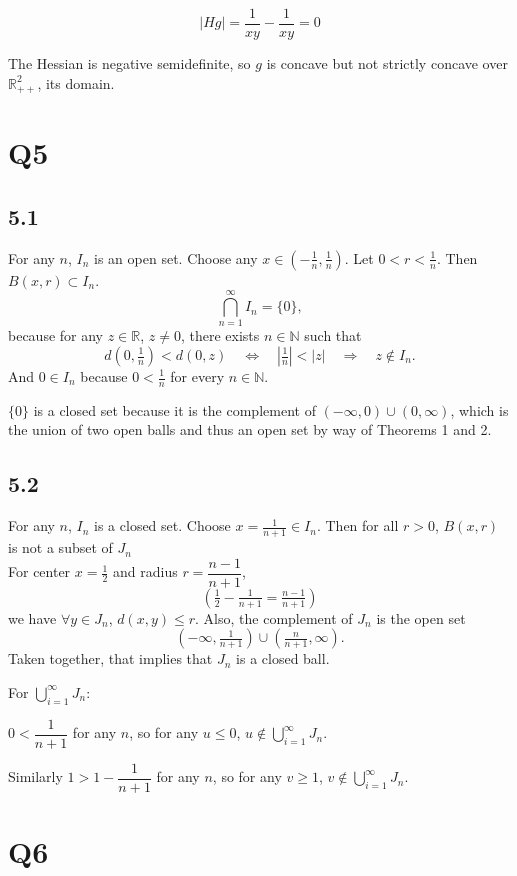 \documentclass{article}
\begin{document}
\[
|Hg|=\frac{1}{xy}-\frac{1}{xy}=0
\]

The Hessian is negative semidefinite, so $g$ is concave but not strictly concave over
$\mathbb{R}^2_{++}$, its domain.

\section*{Q5}

\subsection*{5.1}


For any $n$, $I_n$ is an open set. Choose any $x\in (-\frac{1}{n},\frac{1}{n})$. Let $0 < r < \frac{1}{n}$. Then $B(x,r) \subset I_n$.
\[
\bigcap_{n=1}^{\infty} I_n=\{0\},
\]
because for any $z\in\mathbb{R}$, $z\neq 0$, there exists $n\in\mathbb{N}$ such
that
\[
d(0,\tfrac{1}{n})<d(0,z)
\quad\Longleftrightarrow\quad
\left|\tfrac{1}{n}\right|<|z|
\quad\Longrightarrow\quad
z\notin I_n .
\]
And $0\in I_n$ because $0<\tfrac{1}{n}$ for every $n\in\mathbb{N}$.

$\{0\}$ is a closed set because it is the complement of
$(-\infty,0)\cup(0,\infty)$, which is the union of two open balls and thus an
open set by way of Theorems 1 and 2.

\subsection*{5.2}
For any $n$, $I_n$ is a closed set. Choose $x = \frac{1}{n+1} \in I_n$. Then for all $r > 0$, $B(x,r)$ is not a subset of $J_n$\\

For center $x=\tfrac{1}{2}$ and radius $r=\dfrac{n-1}{n+1}$,
\[
\left(\tfrac{1}{2}-\tfrac{1}{n+1}=\tfrac{n-1}{n+1}\right)
\]
we have $\forall y\in J_n$, $d(x,y)\le r$. Also, the complement of $J_n$ is the
open set
\[
\left(-\infty,\tfrac{1}{n+1}\right)\cup\left(\tfrac{n}{n+1},\infty\right).
\]
Taken together, that implies that $J_n$ is a closed ball.

For $\displaystyle\bigcup_{i=1}^{\infty}J_n$:

$0<\dfrac{1}{n+1}$ for any $n$, so for any $u\le 0$,
$u\notin\displaystyle\bigcup_{i=1}^{\infty}J_n$.

Similarly $1>1-\dfrac{1}{n+1}$ for any $n$, so for any $v\ge 1$,
$v\notin\displaystyle\bigcup_{i=1}^{\infty}J_n$.

\section*{Q6}
\end{document}
